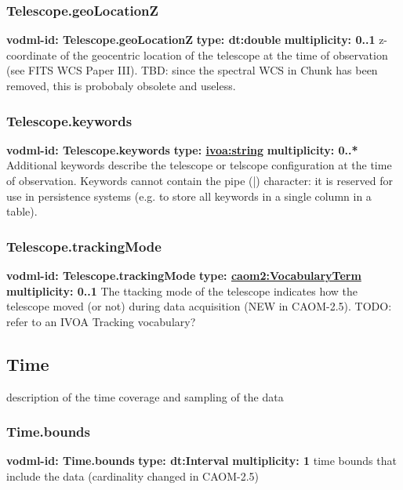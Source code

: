     \subsubsection{Telescope.geoLocationZ}
      \textbf{vodml-id: Telescope.geoLocationZ} \newline
      \textbf{type: dt:double} \newline
      \textbf{multiplicity: 0..1} \newline
      z-coordinate of the geocentric location of the telescope at the time of observation (see FITS WCS Paper III). TBD: since the spectral WCS in Chunk has been removed, this is probobaly obsolete and useless.

    \subsubsection{Telescope.keywords}
      \textbf{vodml-id: Telescope.keywords} \newline
      \textbf{type: \hyperref[sect:ivoa]{ivoa:string}} \newline
      \textbf{multiplicity: 0..*} \newline
      Additional keywords describe the telescope or telscope configuration at the time of observation. Keywords cannot contain the pipe (|) character: it is reserved for use in persistence systems (e.g. to store all keywords in a single column in a table).

    \subsubsection{Telescope.trackingMode}
      \textbf{vodml-id: Telescope.trackingMode} \newline
      \textbf{type: \hyperref[sect:VocabularyTerm]{caom2:VocabularyTerm}} \newline
      \textbf{multiplicity: 0..1} \newline
      The ttacking mode of the telescope indicates how the telescope moved (or not) during data acquisition (NEW in CAOM-2.5). TODO: refer to an IVOA Tracking vocabulary?

  \subsection{Time}
  \label{sect:Time}
    description of the time coverage and sampling of the data

    \subsubsection{Time.bounds}
      \textbf{vodml-id: Time.bounds} \newline
      \textbf{type: dt:Interval} \newline
      \textbf{multiplicity: 1} \newline
      time bounds that include the data (cardinality changed in CAOM-2.5)

